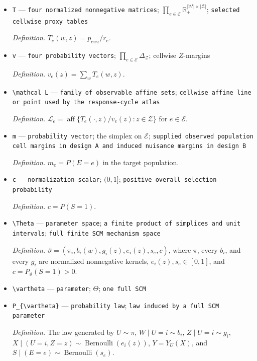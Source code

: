 \documentclass{article}
\begin{document}
\begin{itemize}
  \par\smallskip\noindent\emph{Definition.} \(r_e=\sum_{w,z}p_{ewz}\).
  \item \texttt{T} --- \texttt{four normalized nonnegative matrices}; \(\prod_{e\in\mathcal E}\mathbb R_{+}^{|\mathcal W|\times|\mathcal Z|}\); \texttt{selected cellwise proxy tables}
  \par\smallskip\noindent\emph{Definition.} \(T_e(w,z)=p_{ewz}/r_e\).
  \item \texttt{v} --- \texttt{four probability vectors}; \(\prod_{e\in\mathcal E}\Delta_{\mathcal Z}\); cellwise \(Z\)-margins
  \par\smallskip\noindent\emph{Definition.} \(v_e(z)=\sum_w T_e(w,z)\).
  \item \texttt{\textbackslash{}\allowbreak{}mathcal L} --- \texttt{family of observable affine sets}; \texttt{cellwise affine line or point used by the response-\allowbreak{}cycle atlas}
  \par\smallskip\noindent\emph{Definition.} \(\mathcal L_e=\operatorname{aff}\{T_e(\cdot,z)/v_e(z):z\in\mathcal Z\}\) for \(e\in\mathcal E\).
  \item \texttt{m} --- \texttt{probability vector}; the simplex on \(\mathcal E\); \texttt{supplied observed population cell margins in design A and induced nuisance margins in design B}
  \par\smallskip\noindent\emph{Definition.} \(m_e=P(E=e)\) in the target population.
  \item \texttt{c} --- \texttt{normalization scalar}; \((0,1]\); \texttt{positive overall selection probability}
  \par\smallskip\noindent\emph{Definition.} \(c=P(S=1)\).
  \item \texttt{\textbackslash{}\allowbreak{}Theta} --- \texttt{parameter space}; \texttt{a finite product of simplices and unit intervals}; \texttt{full finite SCM mechanism space}
  \par\smallskip\noindent\emph{Definition.} \(\vartheta=(\pi_i,b_i(w),g_i(z),e_i(z),s_e,c)\), where \(\pi\), every \(b_i\), and every \(g_i\) are normalized nonnegative kernels, \(e_i(z),s_e\in[0,1]\), and \(c=P_{\vartheta}(S=1)>0\).
  \item \texttt{\textbackslash{}\allowbreak{}vartheta} --- \texttt{parameter}; \(\Theta\); \texttt{one full SCM}
  \item \texttt{P\_\allowbreak{}\{\textbackslash{}\allowbreak{}vartheta\}\allowbreak{}} --- \texttt{probability law}; \texttt{law induced by a full SCM parameter}
  \par\smallskip\noindent\emph{Definition.} The law generated by \(U\sim\pi\), \(W\mid U=i\sim b_i\), \(Z\mid U=i\sim g_i\), \(X\mid(U=i,Z=z)\sim\operatorname{Bernoulli}(e_i(z))\), \(Y=Y_U(X)\), and \(S\mid(E=e)\sim\operatorname{Bernoulli}(s_e)\).

\end{itemize}
\end{document}
